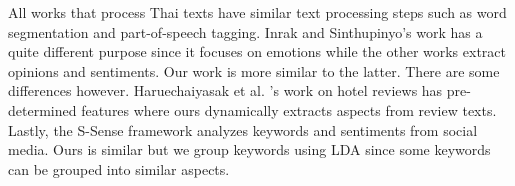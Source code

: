 All works that process Thai texts have similar text processing steps such as word segmentation and part-of-speech tagging. Inrak and Sinthupinyo's work \cite{emotioninthai} has a quite different purpose since it focuses on emotions while the other works \cite{thaiopinionmininghotel,ssense,ssense2} extract opinions and sentiments. Our work is more similar to the latter. There are some differences however. Haruechaiyasak et al. \cite{thaiopinionmininghotel}'s work on hotel reviews has pre-determined features where ours dynamically extracts aspects from review texts. Lastly, the S-Sense framework \cite{ssense,ssense2} analyzes keywords and sentiments from social media. Ours is similar but we group keywords using LDA since some keywords can be grouped into similar aspects. 



